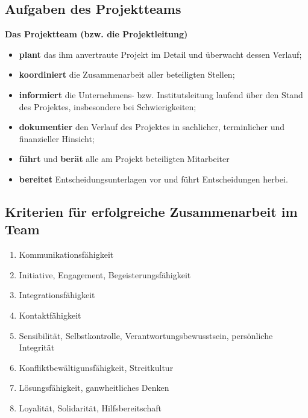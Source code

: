 \documentclass[11pt,a4paper]{article}
\begin{document}
\subsection{Aufgaben des Projektteams}
\textbf{Das Projektteam (bzw. die Projektleitung)}

\begin{itemize}
\item \textbf{plant} das ihm anvertraute Projekt im Detail und überwacht dessen Verlauf;
\item \textbf{koordiniert} die Zusammenarbeit aller beteiligten Stellen;
\item \textbf{informiert} die Unternehmens- bzw. Institutsleitung laufend über den Stand
des Projektes, insbesondere bei Schwierigkeiten;
\item \textbf{dokumentier} den Verlauf des Projektes in sachlicher, terminlicher und
finanzieller Hinsicht;
\item \textbf{führt} und \textbf{berät} alle am Projekt beteiligten Mitarbeiter
\item \textbf{bereitet} Entscheidungsunterlagen vor und führt Entscheidungen herbei.
\end{itemize}

\subsection{Kriterien für erfolgreiche Zusammenarbeit im Team}
\begin{enumerate}
\item Kommunikationsfähigkeit
\item Initiative, Engagement, Begeisterungsfähigkeit
\item Integrationsfähigkeit
\item Kontaktfähigkeit
\item Sensibilität, Selbstkontrolle, Verantwortungsbewusstsein, persönliche Integrität
\item Konfliktbewältigunsfähigkeit, Streitkultur
\item Lösungsfähigkeit, ganwheitliches Denken
\item Loyalität, Solidarität, Hilfsbereitschaft
\end{enumerate}
\end{document}
